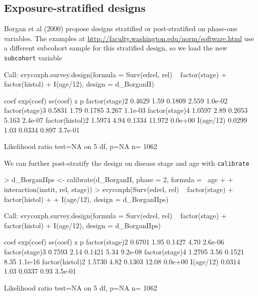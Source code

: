 \documentclass{article}
\begin{document}
\subsection*{Exposure-stratified designs}


Borgan et al (2000) propose designs stratified or post-stratified on
phase-one variables. The examples at
\url{http://faculty.washington.edu/norm/software.html} use a different
subcohort sample for this stratified design, so we load the new
\texttt{subcohort} variable
\begin{Schunk}
\begin{Soutput}
Call:
svycoxph.survey.design(formula = Surv(edrel, rel) ~ factor(stage) + 
    factor(histol) + I(age/12), design = d_BorganII)


                  coef exp(coef) se(coef)      z       p
factor(stage)2  0.4629      1.59   0.1809  2.559 1.0e-02
factor(stage)3  0.5831      1.79   0.1785  3.267 1.1e-03
factor(stage)4  1.0597      2.89   0.2053  5.163 2.4e-07
factor(histol)2 1.5974      4.94   0.1334 11.972 0.0e+00
I(age/12)       0.0299      1.03   0.0334  0.897 3.7e-01

Likelihood ratio test=NA  on 5 df, p=NA  n= 1062 
\end{Soutput}
\end{Schunk}


We can further post-stratify the design on disease stage and age with \texttt{calibrate}
\begin{Schunk}
\begin{Sinput}
> d_BorganIIps <- calibrate(d_BorganII, phase = 2, formula = ~age + 
+     interaction(instit, rel, stage))
> svycoxph(Surv(edrel, rel) ~ factor(stage) + factor(histol) + 
+     I(age/12), design = d_BorganIIps)
\end{Sinput}
\begin{Soutput}
Call:
svycoxph.survey.design(formula = Surv(edrel, rel) ~ factor(stage) + 
    factor(histol) + I(age/12), design = d_BorganIIps)


                  coef exp(coef) se(coef)     z       p
factor(stage)2  0.6701      1.95   0.1427  4.70 2.6e-06
factor(stage)3  0.7593      2.14   0.1421  5.34 9.2e-08
factor(stage)4  1.2705      3.56   0.1521  8.35 1.1e-16
factor(histol)2 1.5730      4.82   0.1303 12.08 0.0e+00
I(age/12)       0.0314      1.03   0.0337  0.93 3.5e-01

Likelihood ratio test=NA  on 5 df, p=NA  n= 1062 
\end{Soutput}
\end{Schunk}
\end{document}

